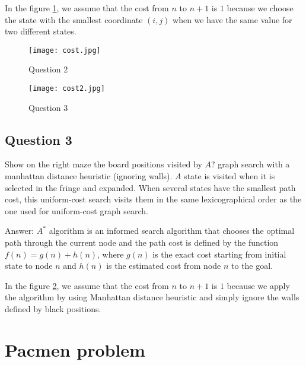 \documentclass[12pt, a4paper]{report}
\begin{document}
In the figure \ref{figure2}, we assume that the cost from $n$ to $n+1$ is $1$ because we choose the state with the smallest coordinate $(i, j)$ when we have the same value for two different states.

\begin{figure}[h]
    \centering
    \caption{Question 2}
    \label{figure2}
    \texttt{[image: cost.jpg]}
\end{figure}

\begin{figure}[h]
    \centering
    \caption{Question 3}
    \label{figure3}
    \texttt{[image: cost2.jpg]}
\end{figure}

\section{Question 3}
Show on the right maze the board positions visited by $A$? graph search with a manhattan distance heuristic (ignoring walls). $A$ state is visited when it is selected in the fringe and expanded. When several states have the smallest path cost, this uniform-cost search visits them in the same lexicographical order as the one used for uniform-cost graph search.
\vspace{0.5 cm}
\par Answer:
$A^{*}$ algorithm is an informed search algorithm that chooses the optimal path through the current node and the path cost is defined by the function $f(n) = g(n) + h(n)$, where $g(n)$ is the exact cost starting from initial state to node $n$ and $h(n)$ is the estimated cost from node $n$ to the goal.

In the figure \ref{figure3}, we assume that the cost from $n$ to $n+1$ is $1$ because we apply the algorithm by using Manhattan distance heuristic and simply ignore the walls defined by black positions. 



\chapter{Pacmen problem}
\end{document}
